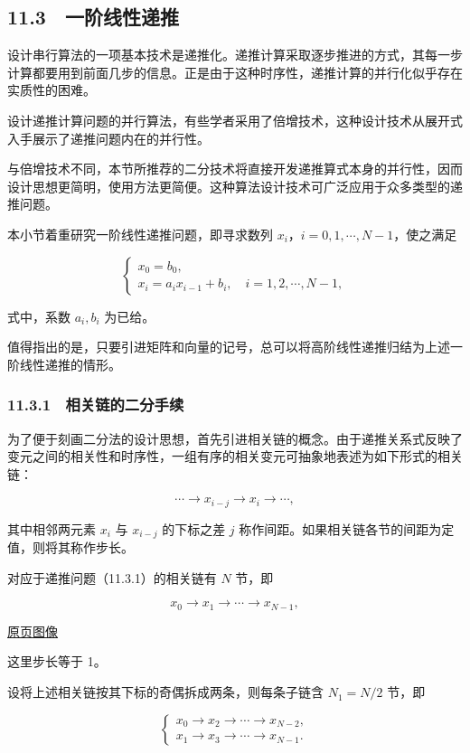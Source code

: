 \documentclass[
  10pt,
  fontset=fandol]{ctexart}
\begin{document}
\subsection{11.3　一阶线性递推}\label{ux4e00ux9636ux7ebfux6027ux9012ux63a8}

设计串行算法的一项基本技术是递推化。递推计算采取逐步推进的方式，其每一步计算都要用到前面几步的信息。正是由于这种时序性，递推计算的并行化似乎存在实质性的困难。

设计递推计算问题的并行算法，有些学者采用了倍增技术，这种设计技术从展开式入手展示了递推问题内在的并行性。

与倍增技术不同，本节所推荐的二分技术将直接开发递推算式本身的并行性，因而设计思想更简明，使用方法更简便。这种算法设计技术可广泛应用于众多类型的递推问题。

本小节着重研究一阶线性递推问题，即寻求数列 \(x_i\)，\(i=0,1,\cdots,N-1\)，使之满足

\[
\begin{cases}
x_0=b_0,\\
x_i=a_i x_{i-1}+b_i,\quad i=1,2,\cdots,N-1,
\end{cases}
\tag{11.3.1}
\]

式中，系数 \(a_i,b_i\) 为已给。

值得指出的是，只要引进矩阵和向量的记号，总可以将高阶线性递推归结为上述一阶线性递推的情形。

\subsubsection{11.3.1　相关链的二分手续}\label{ux76f8ux5173ux94feux7684ux4e8cux5206ux624bux7eed}

为了便于刻画二分法的设计思想，首先引进相关链的概念。由于递推关系式反映了变元之间的相关性和时序性，一组有序的相关变元可抽象地表述为如下形式的相关链：

\[
\cdots\to x_{i-j}\to x_i\to\cdots,
\]

其中相邻两元素 \(x_i\) 与 \(x_{i-j}\) 的下标之差 \(j\) 称作间距。如果相关链各节的间距为定值，则将其称作步长。

对应于递推问题（11.3.1）的相关链有 \(N\) 节，即

\[
x_0\to x_1\to\cdots\to x_{N-1},
\]

\href{../../source-images/pdf-286.jpeg}{原页图像}

这里步长等于 1。

设将上述相关链按其下标的奇偶拆成两条，则每条子链含 \(N_1=N/2\) 节，即

\[
\begin{cases}
x_0\to x_2\to\cdots\to x_{N-2},\\
x_1\to x_3\to\cdots\to x_{N-1}.
\end{cases}
\tag{11.3.2}
\]
\end{document}
